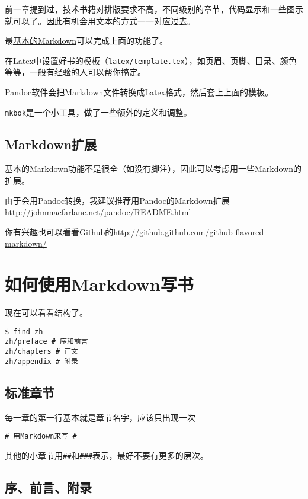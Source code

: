 \documentclass[a4paper]{book}
\begin{document}
前一章提到过，技术书籍对排版要求不高，不同级别的章节，代码显示和一些图示就可以了。因此有机会用文本的方式一一对应过去。

最\href{http://daringfireball.net/projects/markdown/}{基本的Markdown}可以完成上面的功能了。

在Latex中设置好书的模板（{\texttt{latex/template.tex}}），如页眉、页脚、目录、颜色等等，一般有经验的人可以帮你搞定。

Pandoc软件会把Markdown文件转换成Latex格式，然后套上上面的模板。

{\texttt{mkbok}}是一个小工具，做了一些额外的定义和调整。

\subsection{Markdown扩展}

基本的Markdown功能不是很全（如没有脚注），因此可以考虑用一些Markdown的扩展。

由于会用Pandoc转换，我建议推荐用Pandoc的Markdown扩展\url{http://johnmacfarlane.net/pandoc/README.html}

你有兴趣也可以看看Github的\url{http://github.github.com/github-flavored-markdown/}

\section{如何使用Markdown写书}

现在可以看看结构了。

{\footnotesize\begin{shaded}\begin{verbatim}
$ find zh
zh/preface # 序和前言
zh/chapters # 正文
zh/appendix # 附录
\end{verbatim}\end{shaded}}
\subsection{标准章节}

每一章的第一行基本就是章节名字，应该只出现一次

{\footnotesize\begin{shaded}\begin{verbatim}
# 用Markdown来写 #
\end{verbatim}\end{shaded}}
其他的小章节用{\texttt{\#{}\#{}}}和{\texttt{\#{}\#{}\#{}}}表示，最好不要有更多的层次。

\subsection{序、前言、附录}
\end{document}
